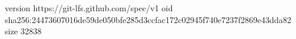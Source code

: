 version https://git-lfs.github.com/spec/v1
oid sha256:24473607016de59de050bfe285d3ccfac172c02945f740e7237f2869e43dda82
size 32838

